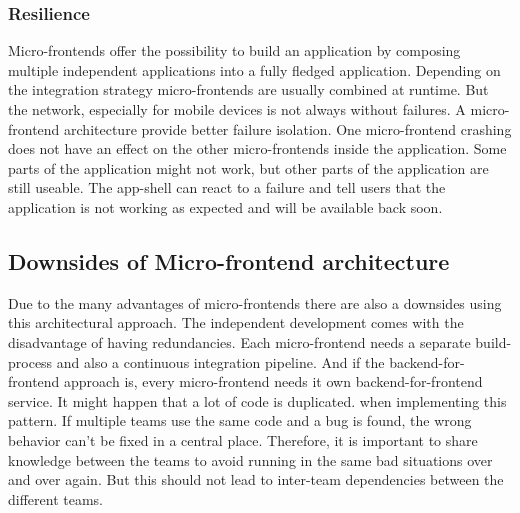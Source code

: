 \subsubsection{Resilience}

Micro-frontends offer the possibility to build an application by composing multiple independent applications into a fully fledged application. Depending on the integration strategy micro-frontends are usually combined at runtime. But the network, especially for mobile devices is not always without failures. A micro-frontend architecture provide better failure isolation. One micro-frontend crashing does not have an effect on the other micro-frontends inside the application. Some parts of the application might not work, but other parts of the application are still useable. The app-shell can react to a failure and tell users that the application is not working as expected and will be available back soon. \cite{article:2021:perltonen:background:micro-frontends:motivations-benefits-and-issues}

\subsection{Downsides of Micro-frontend architecture}

Due to the many advantages of micro-frontends there are also a downsides using this architectural approach. The independent development comes with the disadvantage of having redundancies. Each micro-frontend needs a separate build-process and also a continuous integration pipeline. And if the backend-for-frontend approach is, every micro-frontend needs it own backend-for-frontend service. It might happen that a lot of code is duplicated. when implementing this pattern. If multiple teams use the same code and a bug is found, the wrong behavior can't be fixed in a central place. Therefore, it is important to share knowledge between the teams to avoid running in the same bad situations over and over again. But this should not lead to inter-team dependencies between the different teams.
\cite{book:2020:geers:background:micro-frontends:micro-frontends-in-action} 








